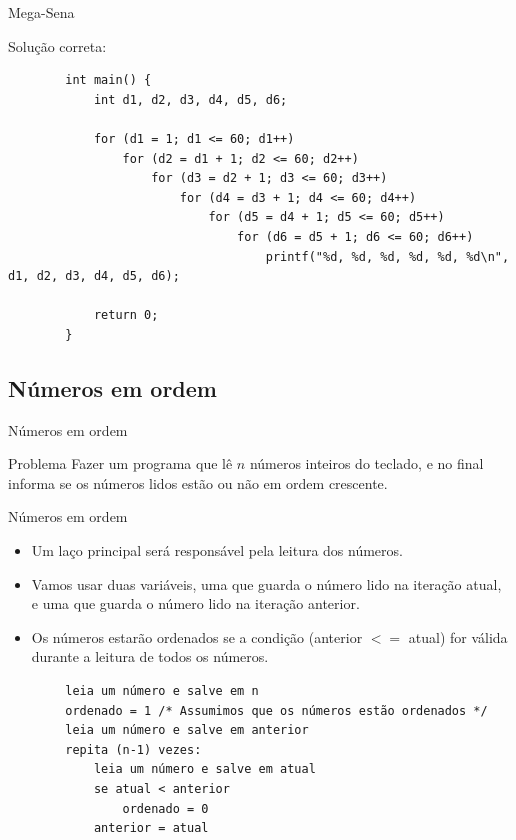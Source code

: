 \documentclass[handout]{beamer}
\begin{document}
\begin{frame}[fragile]{Mega-Sena}

    Solução correta:
        
    \begin{verbatim}
        int main() {
            int d1, d2, d3, d4, d5, d6;

            for (d1 = 1; d1 <= 60; d1++)
                for (d2 = d1 + 1; d2 <= 60; d2++)
                    for (d3 = d2 + 1; d3 <= 60; d3++)
                        for (d4 = d3 + 1; d4 <= 60; d4++)
                            for (d5 = d4 + 1; d5 <= 60; d5++)
                                for (d6 = d5 + 1; d6 <= 60; d6++)
                                    printf("%d, %d, %d, %d, %d, %d\n", d1, d2, d3, d4, d5, d6);

            return 0;
        }
    \end{verbatim}
\end{frame}

\subsection{Números em ordem}%

\begin{frame}[fragile]{Números em ordem}
    \begin{block}{Problema}
        Fazer um programa que lê $n$ números inteiros do teclado, e no final informa se os números lidos estão ou não em ordem crescente.
    \end{block}
\end{frame}

\begin{frame}[fragile]{Números em ordem}

    \begin{itemize}
        \item Um laço principal será responsável pela leitura dos números.
        \item Vamos usar duas variáveis, uma que guarda o número lido na iteração atual, e uma que guarda o número lido na iteração anterior.
        \item Os números estarão ordenados se a condição (anterior $<=$ atual) for válida durante a leitura de todos os números.
    \end{itemize}

    \begin{verbatim}
        leia um número e salve em n
        ordenado = 1 /* Assumimos que os números estão ordenados */
        leia um número e salve em anterior
        repita (n-1) vezes:
            leia um número e salve em atual
            se atual < anterior
                ordenado = 0
            anterior = atual
    \end{verbatim}
\end{frame}
\end{document}

